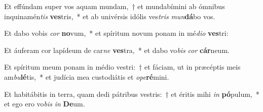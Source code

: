 \item Et effúndam super vos aquam mundam,~† et mundabímini ab ómnibus inquinamén\textit{tis} \textbf{ves}tris,~* et ab univérsis idólis ves\textit{tris} \textit{mun}\textbf{dá}bo vos.
\item Et dabo vobis \textit{cor} \textbf{no}vum,~* et spíritum novum ponam in mé\textit{di}\textit{o} \textbf{ves}tri:
\item Et áuferam cor lapídeum de car\textit{ne} \textbf{ves}tra,~* et dabo vo\textit{bis} \textit{cor} \textbf{cár}neum.
\item Et spíritum meum ponam in médio vestri:~† et fáciam, ut in præcéptis meis am\textit{bu}\textbf{lé}tis,~* et judícia mea custodiátis et \textit{o}\textit{pe}\textbf{ré}mini.
\item Et habitábitis in terra, quam dedi pátribus vestris:~† et éritis mihi \textit{in} \textbf{pó}pulum,~* et ego ero vo\textit{bis} \textit{in} \textbf{De}um.
